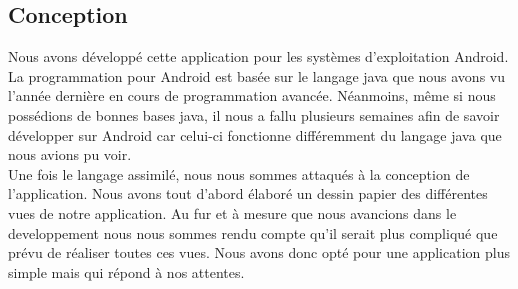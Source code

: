 \subsection{Conception}

Nous avons développé cette application pour les systèmes d'exploitation Android. La programmation pour Android est basée sur le langage java que nous avons vu l'année dernière en cours de programmation avancée. Néanmoins, même si nous possédions de bonnes bases java, il nous a fallu plusieurs semaines afin de savoir développer sur Android car celui-ci fonctionne différemment du langage java que nous avions pu voir. \\

Une fois le langage assimilé, nous nous sommes attaqués à la conception de l'application. Nous avons tout d'abord élaboré un dessin papier des différentes vues de notre application. Au fur et à mesure que nous avancions dans le developpement nous nous sommes rendu compte qu'il serait plus compliqué que prévu de réaliser toutes ces vues. Nous avons donc opté pour une application plus simple mais qui répond à nos attentes.\\

